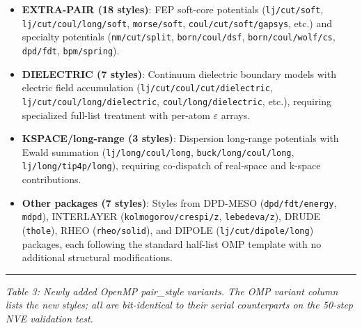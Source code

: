 \documentclass[
  11pt,
]{article}
\providecommand{\tightlist}{%
  \setlength{\itemsep}{0pt}\setlength{\parskip}{0pt}}
\begin{document}
\begin{itemize}
\tightlist
\item
  \textbf{EXTRA-PAIR (18 styles)}: FEP soft-core potentials
  (\texttt{lj/cut/soft}, \texttt{lj/cut/coul/long/soft},
  \texttt{morse/soft}, \texttt{coul/cut/soft/gapsys}, etc.) and
  specialty potentials (\texttt{nm/cut/split}, \texttt{born/coul/dsf},
  \texttt{born/coul/wolf/cs}, \texttt{dpd/fdt}, \texttt{bpm/spring}).
\item
  \textbf{DIELECTRIC (7 styles)}: Continuum dielectric boundary models
  with electric field accumulation (\texttt{lj/cut/coul/cut/dielectric},
  \texttt{lj/cut/coul/long/dielectric}, \texttt{coul/long/dielectric},
  etc.), requiring specialized full-list treatment with per-atom
  \(\varepsilon\) arrays.
\item
  \textbf{KSPACE/long-range (3 styles)}: Dispersion long-range
  potentials with Ewald summation (\texttt{lj/long/coul/long},
  \texttt{buck/long/coul/long}, \texttt{lj/long/tip4p/long}), requiring
  co-dispatch of real-space and k-space contributions.
\item
  \textbf{Other packages (7 styles)}: Styles from DPD-MESO
  (\texttt{dpd/fdt/energy}, \texttt{mdpd}), INTERLAYER
  (\texttt{kolmogorov/crespi/z}, \texttt{lebedeva/z}), DRUDE
  (\texttt{thole}), RHEO (\texttt{rheo/solid}), and DIPOLE
  (\texttt{lj/cut/dipole/long}) packages, each following the standard
  half-list OMP template with no additional structural modifications.
\end{itemize}

\begin{center}\rule{0.5\linewidth}{0.5pt}\end{center}

\emph{Table 3: Newly added OpenMP pair\_style variants. The OMP variant
column lists the new styles; all are bit-identical to their serial
counterparts on the 50-step NVE validation test.}
\end{document}
